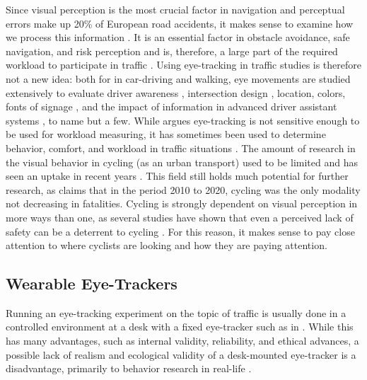 \documentclass[sigconf, natbib=false, nonacm]{acmart}
\begin{document}
    Since visual perception is the most crucial factor in navigation and perceptual errors make up 20\% of European road accidents, it makes sense to examine how we process this information \cite{ERSO2020, Reyes2008, VanGompel2007, Underwood2007}. It is an essential factor in obstacle avoidance, safe navigation, and risk perception and is, therefore, a large part of the required workload to participate in traffic \cite{Lehtonen2014, Werneke2012}. Using eye-tracking in traffic studies is therefore not a new idea: both for in car-driving and walking, eye movements are studied extensively to evaluate driver awareness \cite{Stapel2020}, intersection design \cite{Werneke2012, Crundall2011}, location, colors, fonts of signage \cite{HollanderJustinB.Sussman}, and the impact of information in advanced driver assistant systems \cite{Reyes2008, Kohl2020, OsbeckEmelieAkerman2010}, to name but a few.  While \citeauthor{OsbeckEmelieAkerman2010} argues eye-tracking is not sensitive enough to be used for workload measuring, it has sometimes been used to determine behavior, comfort, and workload in traffic situations \cite{OsbeckEmelieAkerman2010, Mantuano2017a, Berger2018, Cegovnik2018c, Bongiorno2017a}. The amount of research in the visual behavior in cycling (as an urban transport) used to be limited and has seen an uptake in recent years \cite{Lehtonen2016, Vries2017, Mantuano2017a, Trefzger2018, Kovacsova2018, Rupi2019, HollanderJustinB.Sussman}. This field still holds much potential for further research, as \citeauthor{ERSO2020} claims that in the period 2010 to 2020, cycling was the only modality not decreasing in fatalities. Cycling is strongly dependent on visual perception in more ways than one, as several studies have shown that even a perceived lack of safety can be a deterrent to cycling \cite{Fishman2012}. For this reason, it makes sense to pay close attention to where cyclists are looking and how they are paying attention. 
    
    \subsection{Wearable Eye-Trackers} %
    Running an eye-tracking experiment on the topic of traffic is usually done in a controlled environment at a desk with a fixed eye-tracker such as in \cite{Velichkovsky2003, Werneke2012, Reyes2008}. While this has many advantages, such as internal validity, reliability, and ethical advances, a possible lack of realism and ecological validity of a desk-mounted eye-tracker is a disadvantage, primarily to behavior research in real-life \cite{Vansteenkiste2015, Zeuwts2016}. 
    
\end{document}
